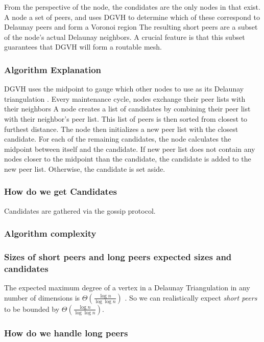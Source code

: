 \documentclass[11pt,conference]{IEEEtran}
\begin{document}
From the perspective of the node, the condidates are the only nodes in that exist.
A node a set of peers, and uses DGVH to determine which of these correspond to Delaunay peers and form a Voronoi region
The resulting short peers are a subset of the node's actual Delaunay neighbors.
A crucial feature is that this subset guarantees that DGVH will form a routable mesh.


\subsubsection*{Algorithm  Explanation}
DGVH uses the midpoint to gauge which other nodes to use as its Delaunay triangulation \cite{dgvh}.
Every maintenance cycle, nodes exchange their peer lists with their neighbors
A node creates a list of candidates by combining their peer list with  their neighbor's peer list.
This list of peers is then sorted from closest to furthest distance.
The node then initializes a new peer list with the closest candidate.
For each of the remaining candidates, the node calculates the midpoint between itself and the candidate.
If new peer list does not contain any nodes closer to the midpoint than the candidate, the candidate is added to the new peer list.
Otherwise, the candidate is set aside.


\subsubsection*{How do we get Candidates}
Candidates are gathered via the gossip protocol.

\subsubsection*{Algorithm complexity}

\subsubsection*{Sizes of short peers and long peers expected sizes and candidates}

The expected maximum degree of a vertex in a Delaunay Triangulation in any number of dimensions is
$\Theta(\frac{\log n}{\log \log n} )$ \cite{bern1991expected}. 
So we can realistically expect \textit{short peers} to be bounded by $\Theta(\frac{\log n}{\log \log n} )$.

\subsubsection*{How do we handle long peers}
\end{document}
